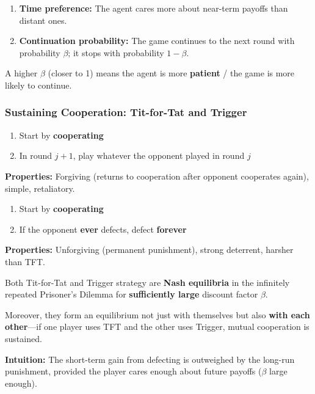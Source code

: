 \begin{defbox}
\begin{enumerate}
  \item \textbf{Time preference:} The agent cares more about near-term payoffs than distant ones.
  \item \textbf{Continuation probability:} The game continues to the next round with probability $\beta$; it stops with probability $1 - \beta$.
\end{enumerate}

A higher $\beta$ (closer to 1) means the agent is more \textbf{patient} / the game is more likely to continue.
\end{defbox}

\separator

\subsubsection{Sustaining Cooperation: Tit-for-Tat and Trigger}

\begin{defbox}
\begin{enumerate}
  \item Start by \textbf{cooperating}
  \item In round $j+1$, play whatever the opponent played in round $j$
\end{enumerate}

\textbf{Properties:} Forgiving (returns to cooperation after opponent cooperates again), simple, retaliatory.
\end{defbox}

\begin{defbox}
\begin{enumerate}
  \item Start by \textbf{cooperating}
  \item If the opponent \textbf{ever} defects, defect \textbf{forever}
\end{enumerate}

\textbf{Properties:} Unforgiving (permanent punishment), strong deterrent, harsher than TFT.
\end{defbox}

\begin{thmbox}
Both Tit-for-Tat and Trigger strategy are \textbf{Nash equilibria} in the infinitely repeated Prisoner's Dilemma for \textbf{sufficiently large} discount factor $\beta$.

Moreover, they form an equilibrium not just with themselves but also \textbf{with each other}---if one player uses TFT and the other uses Trigger, mutual cooperation is sustained.

\textbf{Intuition:} The short-term gain from defecting is outweighed by the long-run punishment, provided the player cares enough about future payoffs ($\beta$ large enough).
\end{thmbox}

